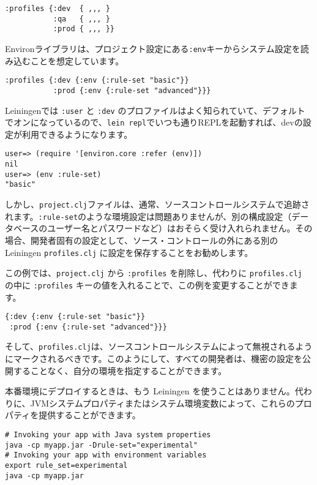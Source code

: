 \begin{lstlisting}[numbers=none]
:profiles {:dev  { ,,, }
           :qa   { ,,, }
           :prod { ,,, }}
\end{lstlisting}

Environライブラリは、プロジェクト設定にある\texttt{:env}キーからシステム設定を読み込むことを想定しています。

\begin{lstlisting}[numbers=none]
:profiles {:dev {:env {:rule-set "basic"}}
           :prod {:env {:rule-set "advanced"}}}
\end{lstlisting}

Leiningenでは \texttt{:user} と \texttt{:dev} のプロファイルはよく知られていて、デフォルトでオンになっているので、\texttt{lein repl}でいつも通りREPLを起動すれば、devの設定が利用できるようになります。

\begin{lstlisting}[numbers=none]
user=> (require '[environ.core :refer (env)])
nil
user=> (env :rule-set)
"basic"
\end{lstlisting}

しかし、\texttt{project.clj}ファイルは、通常、ソースコントロールシステムで追跡されます。\texttt{:rule-set}のような環境設定は問題ありませんが、別の構成設定（データベースのユーザー名とパスワードなど）はおそらく受け入れられません。その場合、開発者固有の設定として、ソース・コントロールの外にある別の Leiningen \texttt{profiles.clj} に設定を保存することをお勧めします。

この例では、\texttt{project.clj} から \texttt{:profiles} を削除し、代わりに \texttt{profiles.clj} の中に \texttt{:profiles} キーの値を入れることで、この例を変更することができます。


\begin{lstlisting}[numbers=none]
{:dev {:env {:rule-set "basic"}}
 :prod {:env {:rule-set "advanced"}}}
\end{lstlisting}

そして、\texttt{profiles.clj}は、ソースコントロールシステムによって無視されるようにマークされるべきです。このようにして、すべての開発者は、機密の設定を公開することなく、自分の環境を指定することができます。

本番環境にデプロイするときは、もう Leiningen を使うことはありません。代わりに、JVMシステムプロパティまたはシステム環境変数によって、これらのプロパティを提供することができます。

\begin{lstlisting}[numbers=none]
# Invoking your app with Java system properties
java -cp myapp.jar -Drule-set="experimental"
# Invoking your app with environment variables
export rule_set=experimental
java -cp myapp.jar
\end{lstlisting}

